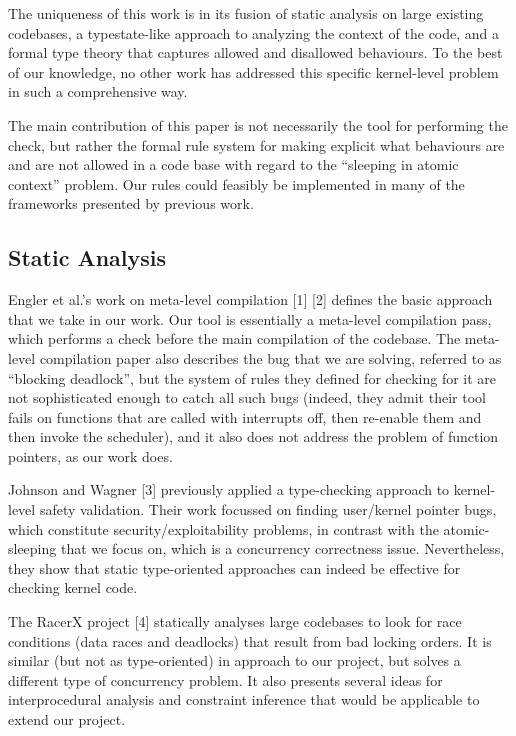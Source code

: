 \documentclass{article}
\begin{document}
The uniqueness of this work is in its fusion of static analysis on large existing codebases, a typestate-like approach to analyzing the context of the code, and a formal type theory that captures allowed and disallowed behaviours. To the best of our knowledge, no other work has addressed this specific kernel-level problem in such a comprehensive way.

The main contribution of this paper is not necessarily the tool for performing the check, but rather the formal rule system for making explicit what behaviours are and are not allowed in a code base with regard to the ``sleeping in atomic context'' problem. Our rules could feasibly be implemented in many of the frameworks presented by previous work.

\subsection{Static Analysis}

Engler et al.'s work on meta-level compilation [1] [2] defines the basic approach that we take in our work. Our tool is essentially a meta-level compilation pass, which performs a check before the main compilation of the codebase. The meta-level compilation paper also describes the bug that we are solving, referred to as ``blocking deadlock'', but the system of rules they defined for checking for it are not sophisticated enough to catch all such bugs (indeed, they admit their tool fails on functions that are called with interrupts off, then re-enable them and then invoke the scheduler), and it also does not address the problem of function pointers, as our work does.

Johnson and Wagner [3] previously applied a type-checking approach to kernel-level safety validation. Their work focussed on finding user/kernel pointer bugs, which constitute security/exploitability problems, in contrast with the atomic-sleeping that we focus on, which is a concurrency correctness issue. Nevertheless, they show that static type-oriented approaches can indeed be effective for checking kernel code.

The RacerX project [4] statically analyses large codebases to look for race conditions (data races and deadlocks) that result from bad locking orders. It is similar (but not as type-oriented) in approach to our project, but solves a different type of concurrency problem. It also presents several ideas for interprocedural analysis and constraint inference that would be applicable to extend our project.
\end{document}
